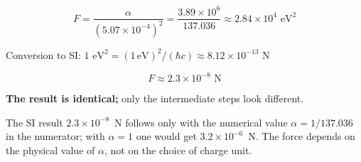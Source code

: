 	\begin{equation}
		F = \frac{\alpha}{(5.07 \times 10^{-4})^2} = \frac{3.89 \times 10^{6}}{137.036} \approx 2.84 \times 10^{4} \text{ eV}^2
	\end{equation}
	
	Conversion to SI: $1 \text{ eV}^2 = (1\,\text{eV})^2/(\hbar c) \approx 8.12 \times 10^{-13}$ N
	
	\begin{equation}
		F \approx 2.3 \times 10^{-8} \text{ N}
	\end{equation}
	
	\textbf{The result is identical;} only the intermediate steps look different.
	
	The SI result $2.3\times10^{-8}$~N follows only with the numerical value $\alpha = 1/137.036$ in the numerator; with $\alpha = 1$ one would get $3.2\times10^{-6}$~N. The force depends on the physical value of $\alpha$, not on the choice of charge unit.
	